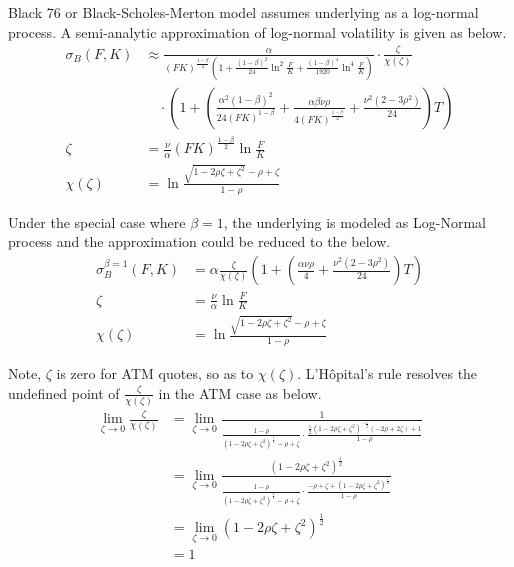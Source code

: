 \documentclass{article}
\begin{document}
Black 76 or Black-Scholes-Merton model assumes underlying as a log-normal process.
A semi-analytic approximation of log-normal volatility is given as below.
\begin{subequations}
    \begin{align}
        \sigma_B{(F, K)} &\approx \frac{\alpha}{(FK)^{\frac{1 - \beta}{2}}\left(1 + \frac{\left(1 - \beta\right)^2}{24} \ln^2{\frac{F}{K}} + \frac{{\left(1 - \beta\right)}^{4}}{1920} \ln^4{\frac{F}{K}}\right)} \cdot \frac{\zeta}{\chi (\zeta)} \nonumber \\
        & \quad \cdot \left(1 + \left(\frac{\alpha^2 {\left(1 - \beta\right)}^{2}}{24 \left(F K\right)^{1 - \beta}} + \frac{\alpha \beta \nu \rho}{4 {\left(F K\right)}^{\frac{1 - \beta}{2}}} + \frac{\nu^2 \left(2 - 3 \rho^2\right)}{24}\right) T\right)\\
        \zeta &= \frac{\nu}{\alpha} {(F K)}^{\frac{1 - \beta}{2}} \ln{\frac{F}{K}} \\
        \chi(\zeta) &= \ln{\frac{\sqrt{1 - 2 \rho \zeta + {\zeta}^2} - \rho + \zeta}{1 - \rho}}
    \end{align}
\end{subequations}

Under the special case where $ \beta = 1 $, the underlying is modeled as Log-Normal process and the approximation could be reduced to the below.
\begin{subequations} \label{SABR_LogNormal_Beta_1}
    \begin{align}
        \sigma_B^{\beta = 1}{(F, K)} &= \alpha \frac{\zeta}{\chi(\zeta)} \left(1 + \left(\frac{\alpha \nu \rho}{4} + \frac{\nu^2 \left(2 - 3 \rho^2\right)}{24}\right) T \right) \\
        \zeta &= \frac{\nu}{\alpha} \ln{\frac{F}{K}} \\
        \chi(\zeta) &= \ln{\frac{\sqrt{1 - 2 \rho \zeta + \zeta^2} - \rho + \zeta}{1 - \rho}}
    \end{align}
\end{subequations}

Note, $ \zeta $ is zero for ATM quotes, so as to $ \chi(\zeta) $.
L'H\^opital's rule resolves the undefined point of $ \frac{\zeta}{\chi(\zeta)} $ in the ATM case as below.
\begin{align}
    \lim_{\zeta \to 0}{\frac{\zeta}{\chi(\zeta)}} &= \lim_{\zeta \to 0}{\frac{1}{\frac{1 - \rho}{\left(1 - 2 \rho \zeta + \zeta^2\right)^{\frac{1}{2}} - \rho + \zeta} \cdot \frac{\frac{1}{2}\left(1 - 2 \rho \zeta + \zeta^2\right)^{-\frac{1}{2}}\left(-2\rho + 2 \zeta \right) + 1}{1 - \rho}}} \nonumber \\
    &= \lim_{\zeta \to 0}{\frac{\left(1 - 2 \rho \zeta + \zeta^2\right)^{\frac{1}{2}}}{\frac{1 - \rho}{\left(1 - 2 \rho \zeta + \zeta^2\right)^{\frac{1}{2}} - \rho + \zeta} \cdot \frac{-\rho + \zeta + \left(1 - 2 \rho \zeta + \zeta^2\right)^{\frac{1}{2}}}{1 - \rho}}} \nonumber \\
    &= \lim_{\zeta \to 0}{\left(1 - 2 \rho \zeta + \zeta^2\right)^{\frac{1}{2}}} \nonumber \\
    &= 1
\end{align}
\end{document}
